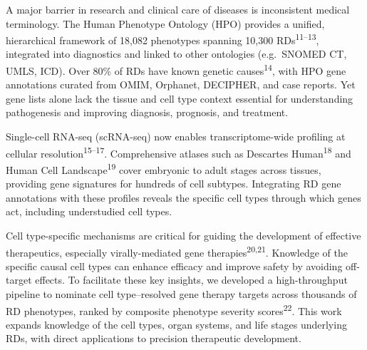 \documentclass[
]{article}
\begin{document}
A major barrier in research and clinical care of diseases is
inconsistent medical terminology. The Human Phenotype Ontology (HPO)
provides a unified, hierarchical framework of 18,082 phenotypes spanning
10,300 RDs\textsuperscript{11--13}, integrated into diagnostics and
linked to other ontologies (e.g.~SNOMED CT, UMLS, ICD). Over 80\% of RDs
have known genetic causes\textsuperscript{14}, with HPO gene annotations
curated from OMIM, Orphanet, DECIPHER, and case reports. Yet gene lists
alone lack the tissue and cell type context essential for understanding
pathogenesis and improving diagnosis, prognosis, and treatment.

Single-cell RNA-seq (scRNA-seq) now enables transcriptome-wide profiling
at cellular resolution\textsuperscript{15--17}. Comprehensive atlases
such as Descartes Human\textsuperscript{18} and Human Cell
Landscape\textsuperscript{19} cover embryonic to adult stages across
tissues, providing gene signatures for hundreds of cell subtypes.
Integrating RD gene annotations with these profiles reveals the specific
cell types through which genes act, including understudied cell types.

Cell type-specific mechanisms are critical for guiding the development
of effective therapeutics, especially virally-mediated gene
therapies\textsuperscript{20,21}. Knowledge of the specific causal cell
types can enhance efficacy and improve safety by avoiding off-target
effects. To facilitate these key insights, we developed a
high-throughput pipeline to nominate cell type--resolved gene therapy
targets across thousands of RD phenotypes, ranked by composite phenotype
severity scores\textsuperscript{22}. This work expands knowledge of the
cell types, organ systems, and life stages underlying RDs, with direct
applications to precision therapeutic development.
\end{document}
